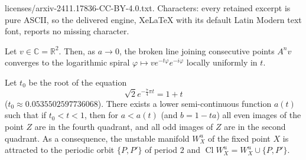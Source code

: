 \documentclass[10pt,a4paper]{amsart}
\def\Cl{\mathop\mathrm{Cl}}
\def\R{{\mathbb R}}
\newcommand{\C}{\mathbb{C}}
\renewcommand{\phi}{\varphi}
\begin{document}
licenses/arxiv-2411.17836-CC-BY-4.0.txt. Characters: every retained excerpt is pure ASCII, so the delivered engine, XeLaTeX with its default Latin Modern text font, reports no missing character.
	\begin{lem}\label{l1}
		Let $v\in\C=\R^2$. Then, as $a\to 0$, the broken line joining
		consecutive points $A^nv$ converges to the logarithmic spiral
		$\phi\mapsto ve^{-t\phi}e^{-i\phi}$ locally uniformly in $t$.
	\end{lem}

	\begin{theorem}\label{t1}
		Let $t_0$ be the root of the equation
		\begin{equation}\label{e1}
			\sqrt{2}e^{-\frac74\pi t} = 1 + t
		\end{equation}
		($t_0 \approx 0.0535502597736068$). There exists a lower 
		semi-continuous function $a(t)$ such that if $t_0 < t < 1$, then for 
		$a < a(t)$ (and $b = 1 - ta$) all even images of the point $Z$ are 
		in the fourth quadrant, and all odd images of $Z$ are in the second 
		quadrant. As a consequence, the unstable manifold $W^u_X$ of the 
		fixed point $X$ is attracted to the periodic orbit $\{ P, P' \}$ of 
		period $2$ and $\Cl W^u_X = W^u_X \cup \{ P, P' \}$.
	\end{theorem}
\end{document}
